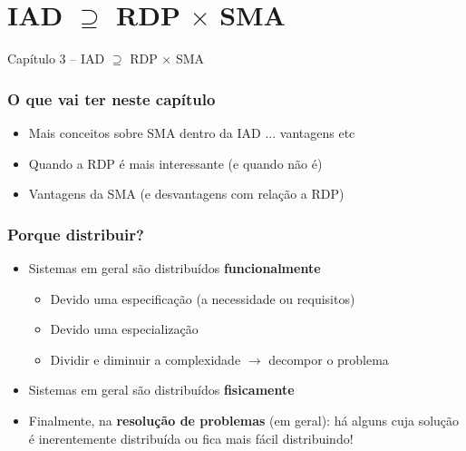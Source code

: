 
\section{IAD $\supseteq $ RDP $\times$ SMA }
\begin{frame}

\begin{center}
{\huge Capítulo 3 -- IAD $\supseteq $ RDP $\times$ SMA }
\end{center}

\end{frame}

\begin{frame} %


\frametitle{O que vai ter neste capítulo}

\begin{itemize}
  \item Mais conceitos sobre SMA dentro da IAD ... vantagens etc
  \item Quando a RDP é mais interessante (e quando não é)
  \item Vantagens da SMA (e desvantagens com relação a RDP)
\end{itemize}


\end{frame}



\begin{frame} %


\frametitle{Porque distribuir?}

\begin{itemize}
  \item Sistemas em geral são distribuídos \textbf{funcionalmente}
  \pause
  \begin{itemize}
    \item Devido uma especificação (a necessidade ou requisitos)
    \item Devido uma especialização
    \item Dividir e diminuir a complexidade $\rightarrow$ decompor o problema
    
  \end{itemize}

  \pause
  \item Sistemas em geral são distribuídos \textbf{fisicamente}
  \pause  
  \item Finalmente, na \textbf{resolução de problemas} (em geral): 
  há alguns cuja solução é inerentemente distribuída ou 
  fica mais fácil distribuindo!
  

\end{itemize}


\end{frame}

